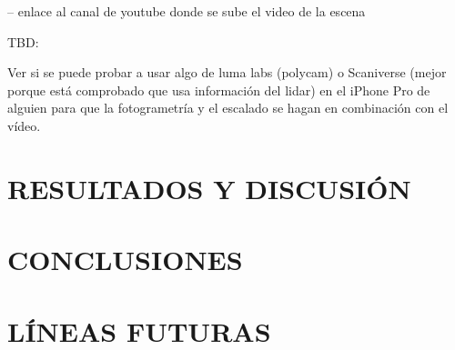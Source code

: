 \documentclass[a4paper, 12pt, spanish, twoside]{article}
\begin{document}
-- enlace al canal de youtube donde se sube el video de la escena 

TBD: 

Ver si se puede probar a usar algo de luma labs (polycam) o Scaniverse (mejor porque está comprobado que usa información del \acrshort{lidar}) en el iPhone Pro de alguien para que la fotogrametría y el escalado se hagan en combinación con el vídeo.  

\clearpage





\newpage
\section{RESULTADOS Y DISCUSIÓN} \label{sec:resultados_y_discusion}

\clearpage





\newpage
\section{CONCLUSIONES} \label{sec:conclusiones}

\clearpage





\newpage
\section{LÍNEAS FUTURAS} \label{sec:lineas_futuras}

\clearpage
\end{document}
